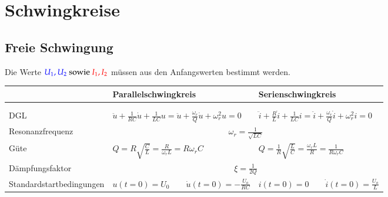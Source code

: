 \section{Schwingkreise}
    \subsection{Freie Schwingung}
        Die Werte $\textcolor{blue}{U_1,U_2}\text{ sowie }\textcolor{red}{I_1,I_2}$ müssen aus den Anfangswerten bestimmt
        werden.\\
        \renewcommand{\arraystretch}{2}
        \begin{tabular}{| p{4cm} | p{7cm} | p{7cm} |}
            \hline
            & \textbf{Parallelschwingkreis} & \textbf{Serienschwingkreis} \\
            \hline
            & & \\
            &  &  \\
            \hline    
            
            DGL &
            $\ddot{u} + \frac{1}{RC} \dot{u} + \frac{1}{LC} u = \ddot{u} + \frac{\omega_r}{Q} \dot{u} + \omega_r^2 u = 0$ &
            $\ddot{i} + \frac{R}{L}  \dot{i} + \frac{1}{LC} i = \ddot{i} + \frac{\omega_r}{Q} \dot{i} + \omega_r^2 i = 0$ \\
            \hline
            
            Resonanzfrequenz &
            \multicolumn{2}{c|}{$\omega_r = \frac{1}{\sqrt{LC}}$} \\
            \hline
            

            Güte & 
            $Q = R\sqrt{\frac{C}{L}} = \frac{R}{\omega_r L}=R\omega_rC$ &
            $Q = \frac{1}{R}\sqrt{\frac{L}{C}} = \frac{\omega_r L}{R}=\frac{1}{R\omega_rC}$ \\
            \hline
            
            Dämpfungsfaktor &
            \multicolumn{2}{c|}{$\xi=\frac{1}{2Q}$} \\
            \hline
            
            Standardstartbedingungen &
            $u(t=0)=U_0 \qquad \dot{u}(t=0)=-\frac{U_o}{RC}$ &
            $i(t=0)=0 \qquad \dot{i}(t=0)=\frac{U_o}{L}$ \\
            \hline
            

\end{tabular}
